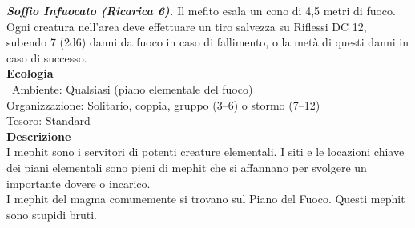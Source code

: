 \begin{multicols}{2}
\emph{\textbf{Soffio Infuocato (Ricarica 6).}} Il mefito esala un cono di 4,5 metri di fuoco. Ogni creatura nell'area deve effettuare un tiro salvezza su Riflessi DC  12, subendo 7 (2d6) danni da fuoco in caso di fallimento, o la metà di questi danni in caso di successo.\\
\textbf{Ecologia}\\\
Ambiente: Qualsiasi (piano elementale del fuoco)\\
Organizzazione: Solitario, coppia, gruppo (3–6) o stormo (7–12)\\
Tesoro: Standard\\
\textbf{Descrizione}\\
I mephit sono i servitori di potenti creature elementali. I siti e le locazioni chiave dei piani elementali sono pieni di mephit che si affannano per svolgere un importante dovere o incarico.\\
I mephit del magma comunemente si trovano sul Piano del Fuoco. Questi mephit sono stupidi bruti.\\



\end{multicols}
